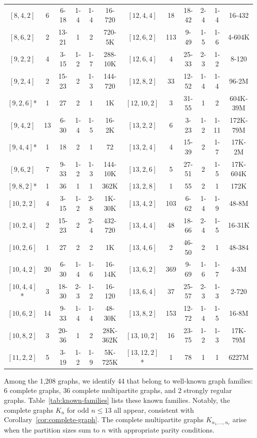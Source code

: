 \documentclass[a4paper,11pt]{article}
\theoremstyle{remark}
\begin{document}
\begin{table}[h]
\begin{tabular}{cccccc|cccccc}
$[8,4,2]$ & 6 & 6-18 & 1-4 & 1-4 & 16-720 & $[12,4,4]$ & 18 & 18-42 & 2-4 & 1-4 & 16-432 \\
$[8,6,2]$ & 2 & 13-21 & 1 & 2 & 720-5K & $[12,6,2]$ & 113 & 9-49 & 1-5 & 1-6 & 4-604K \\
$[9,2,2]$ & 4 & 3-15 & 1-2 & 1-7 & 288-10K & $[12,6,4]$ & 4 & 25-33 & 2-3 & 1-2 & 8-120 \\
$[9,2,4]$ & 2 & 15-23 & 2 & 1-3 & 144-720 & $[12,8,2]$ & 33 & 12-52 & 1-4 & 1-4 & 96-2M \\
$[9,2,6]$* & 1 & 27 & 2 & 1 & 1K & $[12,10,2]$ & 3 & 31-55 & 1 & 2 & 604K-39M \\
$[9,4,2]$ & 13 & 6-30 & 1-4 & 1-5 & 16-2K & $[13,2,2]$ & 6 & 3-23 & 1-2 & 1-11 & 172K-79M \\
$[9,4,4]$* & 1 & 18 & 2 & 1 & 72 & $[13,2,4]$ & 4 & 15-39 & 2 & 1-7 & 17K-2M \\
$[9,6,2]$ & 7 & 9-33 & 1-2 & 1-3 & 144-10K & $[13,2,6]$ & 5 & 27-51 & 2 & 1-5 & 17K-604K \\
$[9,8,2]$* & 1 & 36 & 1 & 1 & 362K & $[13,2,8]$ & 1 & 55 & 2 & 1 & 172K \\
$[10,2,2]$ & 4 & 3-15 & 1-2 & 2-8 & 1K-30K & $[13,4,2]$ & 103 & 6-62 & 1-4 & 1-9 & 48-8M \\
$[10,2,4]$ & 2 & 15-23 & 2 & 2-4 & 432-720 & $[13,4,4]$ & 48 & 18-66 & 2-4 & 1-5 & 16-31K \\
$[10,2,6]$ & 1 & 27 & 2 & 2 & 1K & $[13,4,6]$ & 2 & 46-50 & 2 & 1 & 48-384 \\
$[10,4,2]$ & 20 & 6-30 & 1-4 & 1-6 & 16-14K & $[13,6,2]$ & 369 & 9-69 & 1-6 & 1-7 & 4-3M \\
$[10,4,4]$* & 3 & 18-30 & 2-3 & 1-2 & 16-120 & $[13,6,4]$ & 37 & 25-57 & 2-3 & 1-3 & 2-720 \\
$[10,6,2]$ & 14 & 9-33 & 1-4 & 1-4 & 48-30K & $[13,8,2]$ & 153 & 12-72 & 1-4 & 1-5 & 16-8M \\
$[10,8,2]$ & 3 & 20-36 & 1 & 2 & 28K-362K & $[13,10,2]$ & 16 & 23-75 & 1-2 & 1-3 & 17K-79M \\
$[11,2,2]$ & 5 & 3-19 & 1-2 & 1-9 & 5K-725K & $[13,12,2]$* & 1 & 78 & 1 & 1 & 6227M \\
\hline
\end{tabular}
\end{table}

Among the 1,208 graphs, we identify 44 that belong to well-known graph families: 6 complete graphs, 36 complete multipartite graphs, and 2 strongly regular graphs. Table~\ref{tab:known-families} lists these known families. Notably, the complete graphs $K_n$ for odd $n \leq 13$ all appear, consistent with Corollary~\ref{cor:complete-graph}. The complete multipartite graphs $K_{n_1,\ldots,n_r}$ arise when the partition sizes sum to $n$ with appropriate parity conditions.
\end{document}
